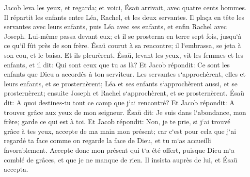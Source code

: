 \verse Jacob leva les yeux, et regarda; et voici, Ésaü arrivait, avec quatre cents hommes. Il répartit les enfants entre Léa, Rachel, et les deux servantes. 
\verse Il plaça en tête les servantes avec leurs enfants, puis Léa avec ses enfants, et enfin Rachel avec Joseph. 
\verse Lui-même passa devant eux; et il se prosterna en terre sept fois, jusqu`à ce qu`il fût près de son frère. 
\verse Ésaü courut à sa rencontre; il l`embrassa, se jeta à son cou, et le baisa. Et ils pleurèrent. 
\verse Ésaü, levant les yeux, vit les femmes et les enfants, et il dit: Qui sont ceux que tu as là? Et Jacob répondit: Ce sont les enfants que Dieu a accordés à ton serviteur. 
\verse Les servantes s`approchèrent, elles et leurs enfants, et se prosternèrent; 
\verse Léa et ses enfants s`approchèrent aussi, et se prosternèrent; ensuite Joseph et Rachel s`approchèrent, et se prosternèrent. 
\verse Ésaü dit: A quoi destines-tu tout ce camp que j`ai rencontré? Et Jacob répondit: A trouver grâce aux yeux de mon seigneur. 
\verse Ésaü dit: Je suis dans l`abondance, mon frère; garde ce qui est à toi. 
\verse Et Jacob répondit: Non, je te prie, si j`ai trouvé grâce à tes yeux, accepte de ma main mon présent; car c`est pour cela que j`ai regardé ta face comme on regarde la face de Dieu, et tu m`as accueilli favorablement. 
\verse Accepte donc mon présent qui t`a été offert, puisque Dieu m`a comblé de grâces, et que je ne manque de rien. Il insista auprès de lui, et Ésaü accepta. 
